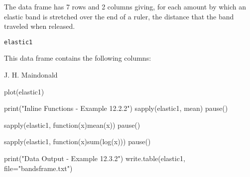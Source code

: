 \begin{Description}\relax
The  data frame has 7 rows and 2 columns
giving, for each amount by which an elastic band is stretched
over the end of a ruler, the distance that the band traveled when
released.
\end{Description}
\begin{Usage}
\begin{verbatim}elastic1\end{verbatim}
\end{Usage}
\begin{Format}\relax
This data frame contains the following columns:
\end{Format}
\begin{Source}\relax
J. H. Maindonald
\end{Source}
\begin{Examples}
\begin{ExampleCode}
plot(elastic1)

print("Inline Functions - Example 12.2.2")
sapply(elastic1, mean)
pause()

sapply(elastic1, function(x)mean(x))
pause()

sapply(elastic1, function(x)sum(log(x)))
pause()

print("Data Output - Example 12.3.2")
write.table(elastic1, file="bandsframe.txt")

\end{ExampleCode}
\end{Examples}

